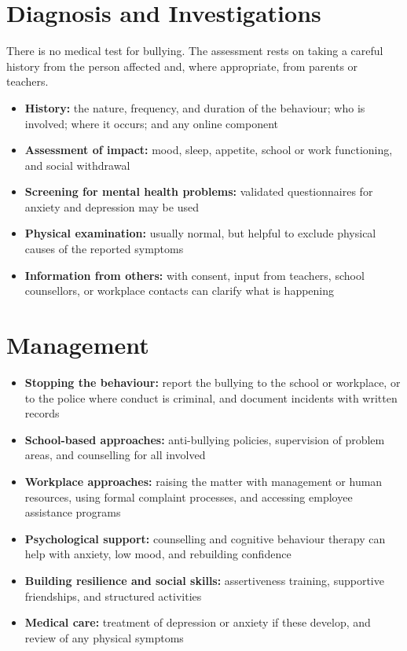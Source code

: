 \section*{Diagnosis and Investigations}
There is no medical test for bullying. The assessment rests on taking a careful history from the person affected and, where appropriate, from parents or teachers.

\begin{itemize}
    \item \textbf{History:} the nature, frequency, and duration of the behaviour; who is involved; where it occurs; and any online component
    \item \textbf{Assessment of impact:} mood, sleep, appetite, school or work functioning, and social withdrawal
    \item \textbf{Screening for mental health problems:} validated questionnaires for anxiety and depression may be used
    \item \textbf{Physical examination:} usually normal, but helpful to exclude physical causes of the reported symptoms
    \item \textbf{Information from others:} with consent, input from teachers, school counsellors, or workplace contacts can clarify what is happening
\end{itemize}

\section*{Management}
\begin{itemize}
    \item \textbf{Stopping the behaviour:} report the bullying to the school or workplace, or to the police where conduct is criminal, and document incidents with written records
    \item \textbf{School-based approaches:} anti-bullying policies, supervision of problem areas, and counselling for all involved
    \item \textbf{Workplace approaches:} raising the matter with management or human resources, using formal complaint processes, and accessing employee assistance programs
    \item \textbf{Psychological support:} counselling and cognitive behaviour therapy can help with anxiety, low mood, and rebuilding confidence
    \item \textbf{Building resilience and social skills:} assertiveness training, supportive friendships, and structured activities
    \item \textbf{Medical care:} treatment of depression or anxiety if these develop, and review of any physical symptoms
\end{itemize}

